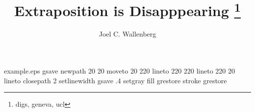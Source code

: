 %
%
%
%
%
\begin{filecontents*}{example.eps}
gsave
newpath
  20 20 moveto
  20 220 lineto
  220 220 lineto
  220 20 lineto
closepath
2 setlinewidth
gsave
  .4 setgray fill
grestore
stroke
grestore
\end{filecontents*}
%
\RequirePackage{fix-cm}
%
\documentclass{svjour3}                     %
%
\smartqed  %
%
\usepackage{mhsetup}
\usepackage{amsmath}
\usepackage{mathtools}
\usepackage{natbib}
\usepackage{graphicx}
\usepackage{float}
\usepackage{qtree}
\usepackage[utf8]{inputenc}
\usepackage{gb4e}
\usepackage[T1]{fontenc}
\usepackage{ tipa }
\usepackage{hyperref}
\newcommand{\noteme}[1]{\noindent \textbf{[[JCW:  #1 ]]}}
\renewcommand{\theequation}{\Alph{equation}}




\title{Extraposition is Disapppearing
\thanks{digs, geneva, ucl}}


\author{Joel C. Wallenberg}




